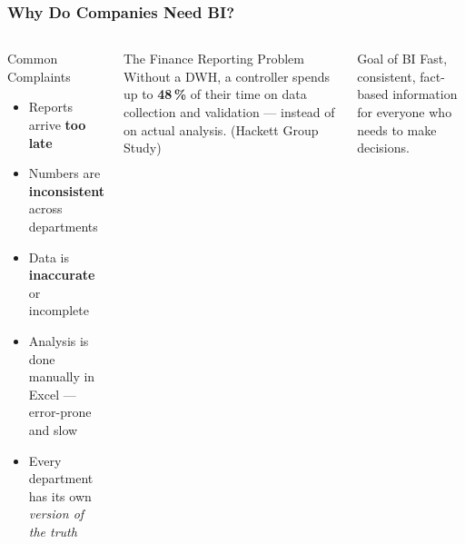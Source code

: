 \begin{frame}
  \frametitle{Why Do Companies Need BI?}

  \begin{columns}[T]
    \begin{block}{Common Complaints}
      \begin{itemize}
        \item Reports arrive \textbf{too late}
        \item Numbers are \textbf{inconsistent} across departments
        \item Data is \textbf{inaccurate} or incomplete
        \item Analysis is done manually in Excel --- error-prone and slow
        \item Every department has its own \textit{version of the truth}
      \end{itemize}
    \end{block}

    \begin{block}{The Finance Reporting Problem}
      Without a DWH, a controller spends up to \textbf{48\,\%} of their time
      on data collection and validation --- instead of on actual analysis.
      \hfill\small(Hackett Group Study)
    \end{block}

    \begin{alertblock}{Goal of BI}
      Fast, consistent, fact-based information for everyone who needs to
      make decisions.
    \end{alertblock}
  \end{columns}
\end{frame}

